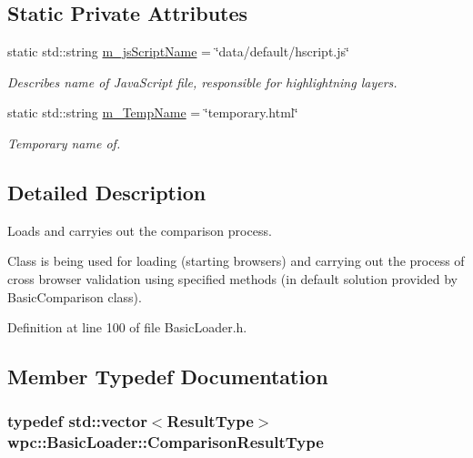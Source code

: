 \subsection*{Static Private Attributes}
\begin{DoxyCompactItemize}
\item 
static std\-::string \hyperlink{classwpc_1_1_basic_loader_a2fb7543b8e4b8b11c55727cc12115f83}{m\-\_\-js\-Script\-Name} = \char`\"{}data/default/hscript.\-js\char`\"{}
\begin{DoxyCompactList}\small\item\em Describes name of Java\-Script file, responsible for highlightning layers. \end{DoxyCompactList}\item 
static std\-::string \hyperlink{classwpc_1_1_basic_loader_ae160d8e7f8dd2e463ee6ccddc7c34073}{m\-\_\-\-Temp\-Name} = \char`\"{}temporary.\-html\char`\"{}
\begin{DoxyCompactList}\small\item\em Temporary name of. \end{DoxyCompactList}\end{DoxyCompactItemize}


\subsection{Detailed Description}
Loads and carryies out the comparison process. 

Class is being used for loading (starting browsers) and carrying out the process of cross browser validation using specified methods (in default solution provided by Basic\-Comparison class). 

Definition at line 100 of file Basic\-Loader.\-h.



\subsection{Member Typedef Documentation}
\hypertarget{classwpc_1_1_basic_loader_abae37c020f8996c8cd770db2edcb3bea}{
\subsubsection[{Comparison\-Result\-Type}]{\setlength{\rightskip}{0pt plus 5cm}typedef std\-::vector$<${\bf Result\-Type}$>$ {\bf wpc\-::\-Basic\-Loader\-::\-Comparison\-Result\-Type}}}\label{classwpc_1_1_basic_loader_abae37c020f8996c8cd770db2edcb3bea}


